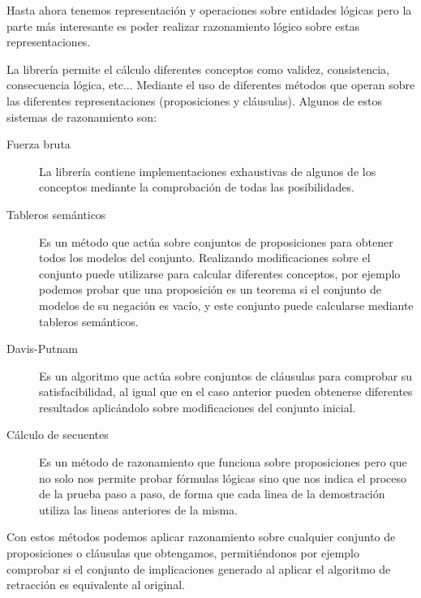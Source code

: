 	Hasta ahora tenemos representación y operaciones sobre entidades lógicas pero la parte más interesante es poder realizar razonamiento lógico sobre estas representaciones.	
	
	La librería permite el cálculo diferentes conceptos como validez, consistencia, consecuencia lógica, etc... Mediante el uso de diferentes métodos que operan sobre las diferentes representaciones (proposiciones y cláusulas). Algunos de estos sistemas de razonamiento son:
	
	\begin{description}
		\item[Fuerza bruta] La librería contiene implementaciones exhaustivas de algunos de los conceptos mediante la comprobación de todas las posibilidades.
		\item[Tableros semánticos] Es un método que actúa sobre conjuntos de proposiciones para obtener todos los modelos del conjunto. Realizando modificaciones sobre el conjunto puede utilizarse para calcular diferentes conceptos, por ejemplo podemos probar que una proposición es un teorema si el conjunto de modelos de su negación es vacío, y este conjunto puede calcularse mediante tableros semánticos.
		\item[Davis-Putnam] Es un algoritmo que actúa sobre conjuntos de cláusulas para comprobar su satisfacibilidad, al igual que en el caso anterior pueden obtenerse diferentes resultados aplicándolo sobre modificaciones del conjunto inicial.
		\item[Cálculo de secuentes] Es un método de razonamiento que funciona sobre proposiciones pero que no solo nos permite probar fórmulas lógicas sino que nos indica el proceso de la prueba paso a paso, de forma que cada linea de la demostración utiliza las lineas anteriores de la misma.
	\end{description}

	Con estos métodos podemos aplicar razonamiento sobre cualquier conjunto de proposiciones o cláusulas que obtengamos, permitiéndonos por ejemplo comprobar si el conjunto de implicaciones generado al aplicar el algoritmo de retracción es equivalente al original.
	
	
	
	
	
	
	
	
	
	
	
	
	
	
	
	
	